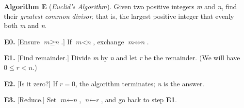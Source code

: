 \documentclass{article}
\begin{document}
	\begin{flushleft}
		\textbf{Algorithm E} (\textit{Euclid's Algorithm}). Given two positive integers \textit{m} and \textit{n}, find their \textit{greatest common divisor}, that is, the largest positive integer that evenly both \textit{m} and \textit{n}.
		\vspace{4mm}
		\par \textbf{E0.} [Ensure $\textit{m}\geq\textit{n}$.] If $\textit{m}<\textit{n}$, exchange $\textit{m}\Leftrightarrow\textit{n}$.
		\vspace{2mm}
		\par \textbf{E1.} [Find  remainder.] Divide \textit{m} by \textit{n} and let \textit{r} be the remainder. (We will have $0\leq\textit{r}<\textit{n}$.)
		\vspace{2mm}
		\par \textbf{E2.} [Is it zero?] If $\textit{r}=0$, the algorithm terminates; \textit{n} is the answer.
		\vspace{2mm}
		\par \textbf{E3.} [Reduce.] Set $\textit{m}\gets\textit{n}$, $\textit{n}\gets\textit{r}$, and go back to step \textbf{E1}.
	\end{flushleft}
\end{document}
